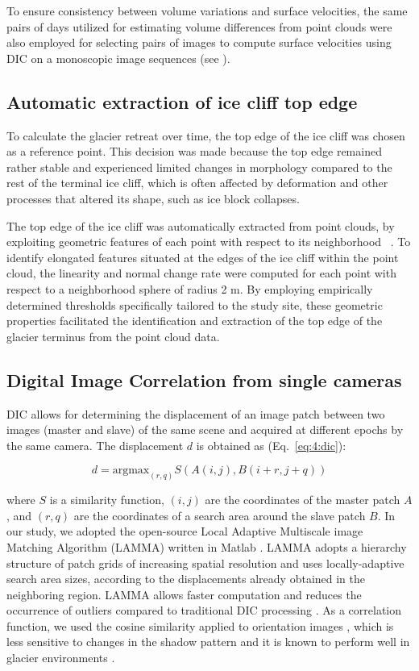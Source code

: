 To ensure consistency between volume variations and surface velocities, the same pairs of
days utilized for estimating volume differences from point clouds were also employed for
selecting pairs of images to compute surface velocities using DIC on a monoscopic image
sequences (see ).

\subsection{Automatic extraction of ice cliff top edge}
\label{sec:4:topedge}
To calculate the glacier retreat over time, the top edge of the ice cliff was chosen as a
reference point.
This decision was made because the top edge remained rather stable and experienced
limited changes in morphology compared to the rest of the terminal ice cliff, which is
often affected by deformation and other processes that altered its shape, such as ice
block collapses.

The top edge of the ice cliff was automatically extracted from point clouds, by
exploiting geometric features of each point with respect to its neighborhood
~\citep{Hackel2016}.
To identify elongated features situated at the edges of the ice cliff within the point
cloud, the linearity and normal change rate were computed for each point with respect to
a neighborhood sphere of radius 2 m. By employing empirically determined thresholds
specifically tailored to the study site, these geometric properties facilitated the
identification and extraction of the top edge of the glacier terminus from the point
cloud data.

\subsection{Digital Image Correlation from single cameras}
\label{sec:4:dic}
DIC allows for determining the displacement of an image patch between two images (master
and slave) of the same scene and acquired at different epochs by the same camera. The
displacement \(d\) is obtained as  (Eq.~\ref{eq:4:dic}):

\begin{equation}
  d = \text{argmax}_{(r,q)} S(A(i,j),B(i+r,j+q))
  \label{eq:4:dic}
\end{equation}

where \(S\) is a similarity function, \((i,j)\) are the coordinates of the master patch
\(A\), and \((r,q)\) are the coordinates of a search area around the slave patch \(B\).
In our study, we adopted the open-source Local Adaptive Multiscale image Matching
Algorithm (LAMMA) written in Matlab \citep{Dematteis2022}.
LAMMA adopts a hierarchy structure of patch grids of increasing spatial resolution and
uses locally-adaptive search area sizes, according to the displacements already
obtained in the neighboring region.
LAMMA allows faster computation and reduces the occurrence of outliers compared to
traditional DIC processing \citep{Dematteis2022}. As a correlation function, we used the
cosine similarity applied to orientation images \citep{Dematteis2021}, which is less
sensitive to changes in the shadow pattern and it is known to perform well in glacier
environments \citep{Heid2012_evaluation_xcorr}.


